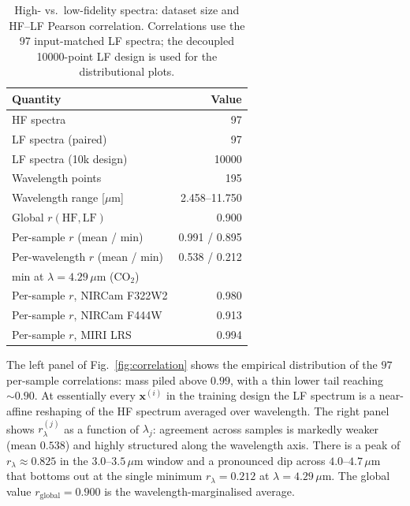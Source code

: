 \documentclass[11pt,a4paper]{article}
\newcommand{\nHF}{97}          %
\newcommand{\nLFpaired}{97}    %
\newcommand{\nLFtenk}{10000}   %
\newcommand{\nwl}{195}         %
\newcommand{\wlmin}{2.458}     %
\newcommand{\wlmax}{11.750}    %
\newcommand{\globalr}{0.900}       %
\newcommand{\persampmean}{0.991}   %
\newcommand{\persampmin}{0.895}    %
\newcommand{\perwlmean}{0.538}     %
\newcommand{\perwlmin}{0.212}      %
\newcommand{\perwlmax}{0.825}      %
\newcommand{\perwlminlam}{4.29}    %
\newcommand{\persampFThreeTwoTwo}{0.980} %
\newcommand{\persampFFourFourFour}{0.913} %
\newcommand{\persampMIRI}{0.994}          %
\newcommand{\xv}{\bm{x}}
\begin{document}
\begin{table}[t]
  \centering
  \caption{High- vs.\ low-fidelity spectra: dataset size and HF--LF
  Pearson correlation. Correlations use the \nLFpaired{} input-matched LF
  spectra; the decoupled \nLFtenk{}-point LF design is used for the
  distributional plots.}
  \label{tab:hf-lf-corr}
  \begin{tabular}{lr}
    \toprule
    Quantity & Value \\
    \midrule
    HF spectra                       & \nHF \\
    LF spectra (paired)              & \nLFpaired \\
    LF spectra (10k design)          & \nLFtenk \\
    Wavelength points                & \nwl \\
    Wavelength range [$\mu$m] & \wlmin--\wlmax \\
    \midrule
    Global $r(\mathrm{HF},\mathrm{LF})$        & \globalr \\
    Per-sample $r$ (mean / min)                & \persampmean{} / \persampmin \\
    Per-wavelength $r$ (mean / min)            & \perwlmean{} / \perwlmin \\
    \quad min at $\lambda=\perwlminlam\,\mu$m (CO$_2$) & \\
    Per-sample $r$, NIRCam F322W2              & \persampFThreeTwoTwo \\
    Per-sample $r$, NIRCam F444W               & \persampFFourFourFour \\
    Per-sample $r$, MIRI LRS                   & \persampMIRI \\
    \bottomrule
  \end{tabular}
\end{table}

The left panel of Fig.~\ref{fig:correlation} shows the empirical distribution of the $97$ per-sample correlations: mass piled above $0.99$, with a thin lower tail reaching $\sim\!0.90$. At essentially every $\xv^{(i)}$ in the training design the LF spectrum is a near-affine reshaping of the HF spectrum averaged over wavelength.
The right panel shows $r_{\lambda}^{(j)}$ as a function of $\lambda_{j}$: agreement across samples is markedly weaker (mean $\perwlmean{}$) and highly structured along the wavelength axis. There is a peak of
$r_{\lambda}\!\approx\!\perwlmax{}$ in the $3.0$--$3.5\,\mu$m window and a
pronounced dip across $4.0$--$4.7\,\mu$m that bottoms out at the single
minimum $r_{\lambda}=\perwlmin{}$ at $\lambda=\perwlminlam\,\mu$m. The global value $r_{\mathrm{global}}=\globalr{}$ is the wavelength-marginalised average.
\end{document}
